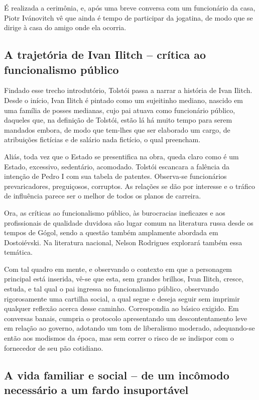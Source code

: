 \documentclass{extarticle}
\begin{document}
É realizada a cerimônia, e, após uma breve conversa com um funcionário
da casa, Piotr Ivánovitch vê que ainda é tempo de participar da
jogatina, de modo que se dirige à casa do amigo onde ela ocorria.

\subsection{A trajetória de Ivan Ilitch -- crítica ao funcionalismo público}

Findado esse trecho introdutório, Tolstói passa a narrar a história de
Ivan Ilitch. Desde o início, Ivan Ilitch é pintado como um sujeitinho
mediano, nascido em uma família de posses medianas, cujo pai atuava como
funcionário público, daqueles que, na definição de Tolstói, estão lá há
muito tempo para serem mandados embora, de modo que tem-lhes que ser
elaborado um cargo, de atribuições fictícias e de salário nada fictício,
o qual preencham.

Aliás, toda vez que o Estado se presentifica na obra, queda claro como é
um Estado, excessivo, sedentário, acomodado. Tolstói escancara a
falência da intenção de Pedro I com sua tabela de patentes. Observa-se
funcionários prevaricadores, preguiçosos, corruptos. As relações se dão
por interesse e o tráfico de influência parece ser o melhor de todos os
planos de carreira.

Ora, as críticas ao funcionalismo público, às burocracias ineficazes e
aos profissionais de qualidade duvidosa são lugar comum na literatura
russa desde os tempos de Gógol, sendo a questão também amplamente
abordada em Dostoiévski. Na literatura nacional, Nelson Rodrigues
explorará também essa temática.

Com tal quadro em mente, e observando o contexto em que a personagem
principal está inserida, vê-se que esta, sem grandes brilhos, Ivan
Ilitch, cresce, estuda, e tal qual o pai ingressa no funcionalismo
público, observando rigorosamente uma cartilha social, a qual segue e
deseja seguir sem imprimir qualquer reflexão acerca desse caminho.
Correspondia ao básico exigido. Em conversas banais, cumpria o protocolo
apresentando um descontentamento leve em relação ao governo, adotando um
tom de liberalismo moderado, adequando-se então aos modismos da época,
mas sem correr o risco de se indispor com o fornecedor de seu pão
cotidiano.

\subsection{A vida familiar e social -- de um incômodo necessário a um fardo
insuportável}
\end{document}
